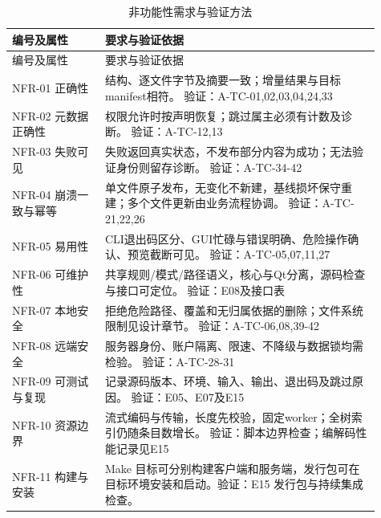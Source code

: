 \begin{longtable}{L{0.23\linewidth}L{0.68\linewidth}}
\caption{非功能性需求与验证方法}\label{tab:nfr}\\\toprule 编号及属性 & 要求与验证依据\\\midrule\endfirsthead
\toprule 编号及属性 & 要求与验证依据\\\midrule\endhead
NFR-01 正确性 & 结构、逐文件字节及摘要一致；增量结果与目标manifest相符。 验证：A-TC-01,02,03,04,24,33\\
NFR-02 元数据正确性 & 权限允许时按声明恢复；跳过属主必须有计数及诊断。 验证：A-TC-12,13\\
NFR-03 失败可见 & 失败返回真实状态，不发布部分内容为成功；无法验证身份则留存诊断。 验证：A-TC-34-42\\
NFR-04 崩溃一致与幂等 & 单文件原子发布，无变化不新建，基线损坏保守重建；多个文件更新由业务流程协调。 验证：A-TC-21,22,26\\
NFR-05 易用性 & CLI退出码区分、GUI忙碌与错误明确、危险操作确认、预览截断可见。 验证：A-TC-05,07,11,27\\
NFR-06 可维护性 & 共享规则/模式/路径语义，核心与Qt分离，源码检查与接口可定位。 验证：E08及接口表\\
NFR-07 本地安全 & 拒绝危险路径、覆盖和无归属依据的删除；文件系统限制见设计章节。 验证：A-TC-06,08,39-42\\
NFR-08 远端安全 & 服务器身份、账户隔离、限速、不降级与数据锁均需检验。 验证：A-TC-28-31\\
NFR-09 可测试与复现 & 记录源码版本、环境、输入、输出、退出码及跳过原因。 验证：E05、E07及E15\\
NFR-10 资源边界 & 流式编码与传输，长度先校验，固定worker；全树索引仍随条目数增长。 验证：脚本边界检查；编解码性能记录见E15\\
NFR-11 构建与安装 & Make 目标可分别构建客户端和服务端，发行包可在目标环境安装和启动。验证：E15 发行包与持续集成检查。\\
\bottomrule\end{longtable}
